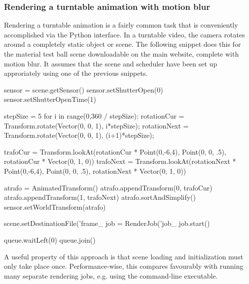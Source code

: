 \subsubsection{Rendering a turntable animation with motion blur}
Rendering a turntable animation is a fairly common task that is
conveniently accomplished via the Python interface. In a turntable
video, the camera rotates around a completely static object or scene.
The following snippet does this for the material test ball scene downloadable
on the main website, complete with motion blur. It assumes that the
scene and scheduler have been set up approriately using one of the previous
snippets.
\begin{python}
sensor = scene.getSensor()
sensor.setShutterOpen(0)
sensor.setShutterOpenTime(1)

stepSize = 5
for i in range(0,360 / stepSize):
    rotationCur  = Transform.rotate(Vector(0, 0, 1), i*stepSize);
    rotationNext = Transform.rotate(Vector(0, 0, 1), (i+1)*stepSize);

    trafoCur  = Transform.lookAt(rotationCur  * Point(0,-6,4),
        Point(0, 0, .5), rotationCur  * Vector(0, 1, 0))
    trafoNext = Transform.lookAt(rotationNext * Point(0,-6,4),
        Point(0, 0, .5), rotationNext * Vector(0, 1, 0))

    atrafo = AnimatedTransform()
    atrafo.appendTransform(0, trafoCur)
    atrafo.appendTransform(1, trafoNext)
    atrafo.sortAndSimplify()
    sensor.setWorldTransform(atrafo)

    scene.setDestinationFile('frame_%
    job = RenderJob('job_%
    job.start()

    queue.waitLeft(0)
    queue.join()
\end{python}
A useful property of this approach is that scene loading and initialization
must only take place once. Performance-wise, this compares favourably with
running many separate rendering jobs, e.g. using the 
command-line executable.

